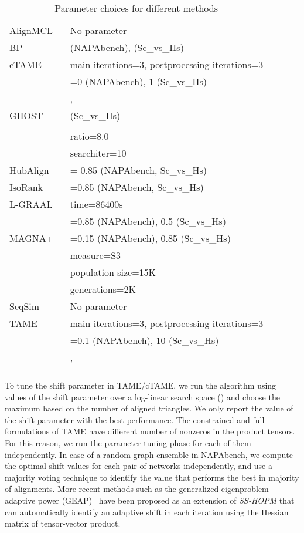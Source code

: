 \documentclass[10pt, journal, compsoc, final]{IEEEtran}
\begin{document}
\begin{table}[!h]
\centering
\begin{tabular}{ll}
 AlignMCL & No parameter\\ \addlinespace
 BP &  (NAPAbench),   (Sc\_vs\_Hs)\\ \addlinespace
 cTAME & main iterations=3, postprocessing iterations=3\\ &=0 (NAPAbench), 1 (Sc\_vs\_Hs)\\ &,  \\ \addlinespace
 GHOST &  (Sc\_vs\_Hs)\\ &  \\ & ratio=8.0 \\ &searchiter=10\\ \addlinespace
 HubAlign & = 0.85 (NAPAbench, Sc\_vs\_Hs) \\ \addlinespace
 IsoRank &  =0.85 (NAPAbench, Sc\_vs\_Hs) \\ \addlinespace
 L-GRAAL&time=86400s \\ &  =0.85 (NAPAbench), 0.5 (Sc\_vs\_Hs) \\  \addlinespace
 MAGNA++&  =0.15 (NAPAbench), 0.85 (Sc\_vs\_Hs) \\ & measure=S3\\&population size=15K\\&generations=2K\\ \addlinespace 
 SeqSim & No parameter\\ \addlinespace
 TAME & main iterations=3, postprocessing iterations=3\\ &=0.1 (NAPAbench), 10 (Sc\_vs\_Hs)\\  &,  \\ \addlinespace
 
\end{tabular}
\caption{Parameter choices for different methods}
\label{table:params}
\end{table}



To tune the shift parameter  in TAME/cTAME, we run the algorithm using values of the shift 
parameter over a log-linear search space () and choose the maximum 
based on the number of aligned triangles. 
We only report the value of the shift parameter with the best performance. 
The constrained and full formulations of TAME have different number of nonzeros in
the product tensors. For this reason, we run the parameter tuning phase 
for each of them independently.
In case of a random graph ensemble in NAPAbench, we compute the optimal shift values for each 
pair of networks independently, and use a majority voting technique to identify the value 
that performs the best in majority of alignments. More recent methods such as the generalized eigenproblem adaptive power (GEAP)~\cite{KoMa14} have been proposed as an extension of \textit{SS-HOPM}
that can automatically identify an adaptive shift in each iteration using the Hessian matrix of tensor-vector product.
\end{document}
